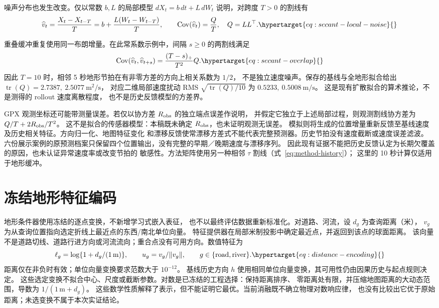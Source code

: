 \begin{samepage}
噪声分布也发生改变。仅以常数 \(b,L\) 的局部模型
\(dX_t=b\,dt+L\,dW_t\) 说明，对跨度 \(T>0\) 的割线有
\begin{equation}
\widehat v_t=\frac{X_t-X_{t-T}}{T}
=b+\frac{L(W_t-W_{t-T})}{T},\qquad
\operatorname{Cov}(\widehat v_t)=\frac{Q}{T},\quad Q=LL^\top .
\label{eq:secant-local-noise}\hypertarget{eq:secant-local-noise}{}
\end{equation}
\end{samepage}
重叠缓冲重复使用同一布朗增量。在此常系数示例中，间隔 \(s\ge0\) 的两割线满足
\begin{equation}
\operatorname{Cov}(\widehat v_t,\widehat v_{t+s})
=\frac{(T-s)_+}{T^2}Q .
\label{eq:secant-overlap}\hypertarget{eq:secant-overlap}{}
\end{equation}
因此 \(T=10\) 时，相邻 5 秒地形节拍在有非零方差的方向上相关系数为 \(1/2\)，
不是独立速度噪声。保存的基线与全地形拟合给出
\(\operatorname{tr}(Q)=2.7387,\ 2.5077\ \mathrm{m^2/s}\)，
对应二维局部速度扰动 RMS \(\sqrt{\operatorname{tr}(Q)/10}\)
为 \(0.5233,\ 0.5008\ \mathrm{m/s}\)。
这是现有扩散拟合的算术推论，不是测得的 rollout 速度离散程度，
也不是历史反馈模型的方差界。

GPX 观测坐标还可能带测量误差。若仅以协方差 \(R_{\rm obs}\) 的独立端点误差作说明，
并假定它独立于上述局部过程，则观测割线协方差为 \(Q/T+2R_{\rm obs}/T^2\)。
这不是拟合的传感器模型：本稿既未确定 \(R_{\rm obs}\)，也未证明观测无误差。
模拟则将生成的位置增量重新反馈至基线速度及历史相关特征。方向归一化、地图特征变化
和漂移反馈使常漂移方差式不能代表完整预测器。历史节拍没有速度截断或速度误差滤波。
六份展示案例的原预测档案只保留四个位置输出，没有完整的早期／晚期速度与漂移序列。
因此现有证据不能把历史反馈认定为长期欠覆盖的原因，也未认证异常速度率或改变节拍的
敏感性。方法矩阵使用另一种相邻 \(\tau\) 割线（式~\eqref{eq:method-history}）；
这里的 10 秒计算仅适用于地形缓冲。


\section{冻结地形特征编码}
\label{sec:feature-encoding}\hypertarget{sec:feature-encoding}{}
地形条件器使用冻结的逐点变换，不新增学习式嵌入表征，
也不以最终评估数据重新标准化。对道路、河流，设 \(d_g\) 为查询距离（米），
\(v_g\) 为从查询位置指向选定折线上最近点的东西/南北单位向量。
特征提供器在局部米制投影中确定最近点，并返回到该点的球面距离。
该向量不是道路切线、道路行进方向或河流流向；重合点没有可用方向。数值特征为
\begin{equation}
\ell_g=\log\{1+d_g/(1\,\mathrm{m})\},\qquad
u_g=v_g/\|v_g\|,\qquad g\in\{\mathrm{road},\mathrm{river}\}.
\label{eq:distance-encoding}\hypertarget{eq:distance-encoding}{}
\end{equation}
距离仅在非负时有效；单位向量变换要求范数大于 \(10^{-12}\)。
基线历史方向 \(h\) 使用相同单位向量变换，其可用性仍由因果历史与起点规则决定。
这些选定变换不拟合中心、尺度或截断参数。对数是已冻结的工程选择：保持距离排序、
零距离处有限，并压缩地图距离的大动态范围，导数为 \(1/(1\,\mathrm m+d_g)\)。
这些数学性质解释了表示，但不能证明它最优。当前消融既不确立物理对数响应律，
也没有比较出它优于原始距离；未选变换不属于本次实证结论。

